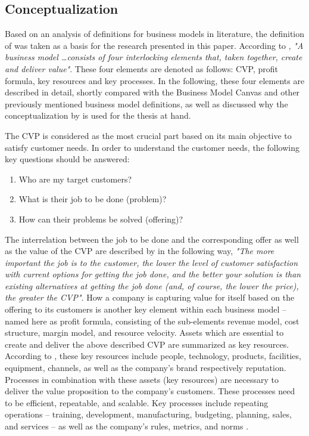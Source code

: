 \subsection{Conceptualization}\label{ch:tf:bmc}

Based on an analysis of definitions for business models in literature, the definition of \citet{Johnson2008} was taken as a basis for the research presented in this paper. According to \citet[p. 52]{Johnson2008}, \textit{"A business model \ldots consists of four interlocking elements that, taken together, create and deliver value"}. These four elements are denoted as follows: \ac{CVP}, profit formula, key resources and key processes. In the following, these four elements are described in detail, shortly compared with the Business Model Canvas \citep{Osterwalder2010} and other previously mentioned business model definitions, as well as discussed why the conceptualization by \citet{Johnson2008} is used for the thesis at hand.

The \ac{CVP} is considered as the most crucial part based on its main objective to satisfy customer needs. In order to understand the customer needs, the following key questions should be answered: 

\begin{enumerate}[parsep=0pt, topsep=0pt, itemsep=0pt]
	\item Who are my target customers?
	\item What is their job to be done (problem)?
	\item How can their problems be solved (offering)? 
\end{enumerate}

The interrelation between the job to be done and the corresponding offer as well as the value of the \ac{CVP} are described by  \citet[p. 52]{Johnson2008} in the following way, \textit{"The more important the job is to the customer, the lower the level of customer satisfaction with current options for getting the job done, and the better your solution is than existing alternatives at getting the job done (and, of course, the lower the price), the greater the \ac{CVP}"}. How a company is capturing value for itself based on the offering to its customers is another key element within each business model -- named here as profit formula, consisting of the sub-elements revenue model, cost structure, margin model, and resource velocity. Assets which are essential to create and deliver the above described \ac{CVP} are summarized as key resources. According to \citet[p. 53]{Johnson2008}, these key resources include people, technology, products, facilities, equipment, channels, as well as the company's brand respectively reputation. Processes in combination with these assets (key resources) are necessary to deliver the value proposition to the company's customers. These processes need to be efficient, repeatable, and scalable. Key processes include repeating operations -- training, development, manufacturing, budgeting, planning, sales, and services -- as well as the company's rules, metrics, and norms \citep[p. 53]{Johnson2008}.

